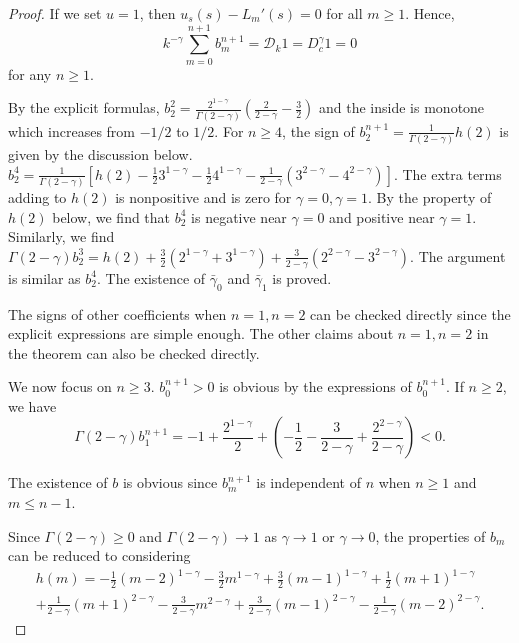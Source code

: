 \documentclass[11pt]{article}
\begin{document}
\begin{proof}
If we set $u=1$, then $u_s(s)-L_m'(s)=0$ for all $m\ge 1$. Hence, $$
k^{-\gamma}\sum_{m=0}^{n+1}b_m^{n+1}=\mathcal{D}_k1=D_c^{\gamma}1=0
$$
for any $n\ge 1$.

By the explicit formulas, $b_2^2=\frac{2^{1-\gamma}}{\Gamma(2-\gamma)}(\frac{2}{2-\gamma}-\frac{3}{2})$ and the inside is monotone which increases from $-1/2$ to $1/2$. For $n\ge 4$, the sign of $b_2^{n+1}=\frac{1}{\Gamma(2-\gamma)}h(2)$ is given by the discussion below. $b_2^4=\frac{1}{\Gamma(2-\gamma)}[h(2)-\frac{1}{2}3^{1-\gamma}-\frac{1}{2}4^{1-\gamma}-\frac{1}{2-\gamma}(3^{2-\gamma}-4^{2-\gamma})]$. The extra terms adding to $h(2)$ is nonpositive and is zero for $\gamma=0, \gamma=1$. By the property of $h(2)$ below, we find that $b_2^{4}$ is negative near $\gamma=0$ and positive near $\gamma=1$. Similarly, we find $\Gamma(2-\gamma)b_2^3=h(2)+\frac{3}{2}(2^{1-\gamma}+3^{1-\gamma})+\frac{3}{2-\gamma}(2^{2-\gamma}-3^{2-\gamma})$. The argument is similar as $b_2^4$.
The existence of $\bar{\gamma}_0$ and $\bar{\gamma}_1$ is proved.

The signs of other coefficients when $n=1, n=2$ can be checked directly since the explicit expressions are simple enough. The other claims about $n=1, n=2$ in the theorem can also be checked directly.

We now focus on $n\ge 3$. $b_0^{n+1}>0$ is obvious by the expressions of $b_0^{n+1}$. If $n\ge 2$, we have $$
\Gamma(2-\gamma)b_1^{n+1}=-1+\frac{2^{1-\gamma}}{2}+(-\frac{1}{2}-\frac{3}{2-\gamma}+\frac{2^{2-\gamma}}{2-\gamma})< 0.
$$

The existence of $b$ is obvious since $b_m^{n+1}$ is independent of $n$ when $n\ge 1$ and $m\le n-1$.

Since $\Gamma(2-\gamma)\ge 0$ and $\Gamma(2-\gamma)\to 1$ as $\gamma\to 1$ or $\gamma\to 0$, the properties of $b_m$ can be reduced to considering
\begin{multline*}
h(m)=-\frac{1}{2}(m-2)^{1-\gamma}-\frac{3}{2}m^{1-\gamma}+\frac{3}{2}(m-1)^{1-\gamma}+\frac{1}{2}(m+1)^{1-\gamma}\\
+\frac{1}{2-\gamma}(m+1)^{2-\gamma}
-\frac{3}{2-\gamma}m^{2-\gamma}
+\frac{3}{2-\gamma}(m-1)^{2-\gamma}
-\frac{1}{2-\gamma}(m-2)^{2-\gamma}.
\end{multline*}



\end{proof}
\end{document}
